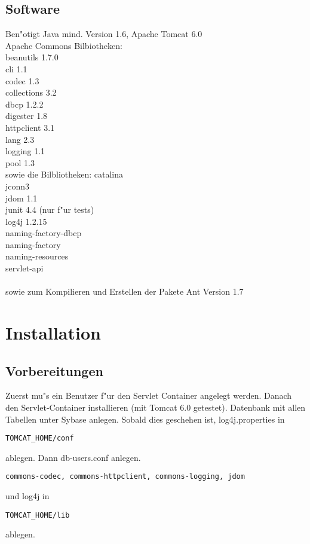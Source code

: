 \documentclass[a4paper,12pt]{scrreprt}
\begin{document}
\section{Software}
Ben"otigt Java mind. Version 1.6, Apache Tomcat 6.0\\
Apache Commons Bilbiotheken:\\
beanutils 1.7.0\\
cli 1.1\\
codec 1.3\\
collections 3.2\\
dbcp 1.2.2\\
digester 1.8\\
httpclient 3.1\\
lang 2.3\\
logging 1.1\\
pool 1.3\\
sowie die Bilbliotheken:
catalina \\
jconn3\\
jdom 1.1\\
junit 4.4 (nur f"ur tests)\\
log4j 1.2.15\\
naming-factory-dbcp\\
naming-factory\\
naming-resources\\
servlet-api\\
\\
sowie zum Kompilieren und Erstellen der Pakete Ant Version 1.7
\chapter{Installation}
\section{Vorbereitungen}
Zuerst mu"s ein Benutzer f"ur den Servlet Container angelegt werden. Danach den Servlet-Container installieren (mit Tomcat 6.0 getestet).
Datenbank mit allen Tabellen unter Sybase anlegen.
Sobald dies geschehen ist, log4j.properties in \begin{verbatim}
TOMCAT_HOME/conf 
\end{verbatim} ablegen.
Dann db-users.conf anlegen.
\begin{verbatim}commons-codec, commons-httpclient, commons-logging, jdom\end{verbatim} und log4j in \begin{verbatim}TOMCAT_HOME/lib\end{verbatim} ablegen.
\end{document}
